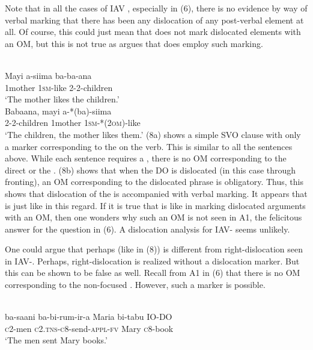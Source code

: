 \documentclass[output=paper
,newtxmath
,modfonts
,nonflat]{langsci/langscibook}
\begin{document}
Note that in all the cases of IAV , especially in (6), there is no evidence by way of verbal marking that there has been any dislocation of any post-verbal element at all. Of course, this could just mean that  does not mark dislocated elements with an OM, but this is not true as \citet{Sikuku2012} argues that  does employ such marking.

\ea\label{ex:selvanathan:8}
 \citep[8]{Sikuku2012}\\
\ea\label{ex:selvanathan:8a}
\gll Mayi     a-siima   ba-ba-ana\\
1mother   \textsc{1sm}{}-like   2-2-children \\
\glt `The mother likes the children.' \\

\ex\label{ex:selvanathan:8b}
\gll Babaana,   mayi     a-*(ba)-siima\\
	2-2-children   1mother   \textsc{1sm}{}-*(\textsc{2om})-like \\
\glt `The children, the mother likes them.' 
\z
\z
(8a) shows a simple SVO clause with only a marker corresponding to the  on the verb. This is similar to all the  sentences above. While each sentence requires a , there is no OM corresponding to the direct or the . (8b) shows that when the DO is dislocated (in this case through fronting), an OM corresponding to the dislocated phrase is obligatory. Thus, this shows that dislocation of the  is accompanied with verbal marking. It appears that  is just like  in this regard. If it is true that  is like  in marking dislocated arguments with an OM, then one wonders why such an OM is not seen in A1, the felicitous answer for the question in (6). A dislocation analysis for  IAV- seems unlikely. 

One could argue that perhaps  (like in (8)) is different from right-dislocation seen in IAV-. Perhaps, right-dislocation is realized without a dislocation marker. But this can be shown to be false as well. Recall from A1 in (6) that there is no OM corresponding to the non-focused . However, such a marker is possible. 

\ea\label{ex:selvanathan:9}
\\
\gll ba-saani    ba-bi-rum-ir-a           Maria   bi-tabu    IO-DO \\
\textsc{c}2-men      \textsc{c}2.\textsc{tns}{}-\textsc{c}8-send-\textsc{appl}{}-\textsc{fv}  Mary     \textsc{c}8-book  \\ 
\glt `The men sent Mary books.'
\z
\end{document}
